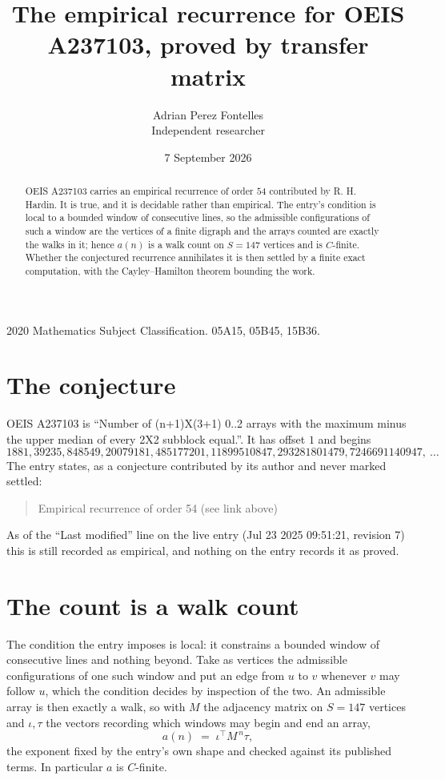 \documentclass[11pt,a4paper]{article}
\title{The empirical recurrence for OEIS A237103, proved by transfer matrix}
\author{Adrian Perez Fontelles\\ \small Independent researcher}
\date{7 September 2026}
\theoremstyle{plain}
\theoremstyle{definition}
\begin{document}
\maketitle

\begin{abstract}
OEIS A237103 carries an empirical recurrence of order $54$ contributed by R. H. Hardin. It is
true, and it is decidable rather than empirical. The entry's condition is local to a bounded window of consecutive lines, so
the admissible configurations of such a window are the vertices of a finite digraph and the
arrays counted are exactly the walks in it; hence $a(n)$ is a walk count on $S=147$ vertices
and is $C$-finite. Whether the conjectured recurrence annihilates it is then settled by a
finite exact computation, with the Cayley--Hamilton theorem bounding the work.
\end{abstract}

\noindent\small 2020 Mathematics Subject Classification. 05A15, 05B45, 15B36.\normalsize

\section{The conjecture}

OEIS A237103 is ``Number of (n+1)X(3+1) 0..2 arrays with the maximum minus the upper median of every 2X2 subblock equal.''. It has offset $1$ and begins
\[
1881, 39235, 848549, 20079181, 485177201, 11899510847, 293281801479, 7246691140947,\ \dots
\]
The entry states, as a conjecture contributed by its author and never marked settled:
\begin{quote}
Empirical recurrence of order 54 (see link above)
\end{quote}
As of the ``Last modified'' line on the live entry (Jul 23 2025 09:51:21, revision 7) this is still
recorded as empirical, and nothing on the entry records it as proved.

\section{The count is a walk count}

The condition the entry imposes is local: it constrains a bounded window of consecutive lines and nothing beyond. Take as
vertices the admissible configurations of one such window and put an edge from $u$ to $v$
whenever $v$ may follow $u$, which the condition decides by inspection of the two. An
admissible array is then exactly a walk, so with $M$ the adjacency matrix on $S=147$ vertices
and $\iota,\tau$ the vectors recording which windows may begin and end an array,
\[
a(n)\;=\;\iota^{\!\top}M^{\,n}\tau ,
\]
the exponent fixed by the entry's own shape and checked against its published terms. In
particular $a$ is $C$-finite.
\end{document}
